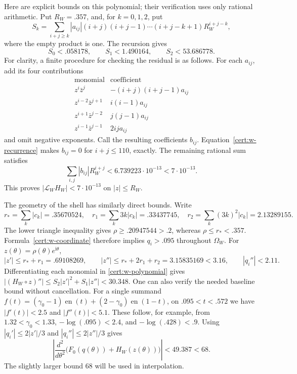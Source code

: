 \documentclass[11pt]{article}
\numberwithin{equation}{section}
\theoremstyle{definition}
\theoremstyle{remark}
\DeclareMathOperator{\en}{en}
\begin{document}
Here are explicit bounds on this polynomial; their verification uses
only rational arithmetic.  Put $R_W=.357$, and, for $k=0,1,2$, put
\[
 S_k=\sum_{i+j\ge k}|a_{ij}|(i+j)(i+j-1)\cdots(i+j-k+1)
                      R_W^{i+j-k},
\]
where the empty product is one.  The recursion gives
\begin{equation}
 S_0<.058178,
 \qquad S_1<1.490164,
 \qquad S_2<53.686778.
 \label{cert:w-norms}
\end{equation}
For clarity, a finite procedure for checking the residual is as follows.
For each $a_{ij}$, add its four contributions
\[
 \begin{array}{c|c}
 \text{monomial}&\text{coefficient}\\ \hline
 z^i\bar z^j&-(i+j)(i+j-1)a_{ij}\\
 z^{i-2}\bar z^{j+1}&i(i-1)a_{ij}\\
 z^{i+1}\bar z^{j-2}&j(j-1)a_{ij}\\
 z^{i-1}\bar z^{j-1}&2ij a_{ij}
 \end{array}
\]
and omit negative exponents.  Call the resulting coefficients $b_{ij}$.
Equation~\eqref{cert:w-recurrence} makes $b_{ij}=0$ for $i+j\le110$,
exactly.  The remaining rational sum satisfies
\begin{equation}
 \sum_{i,j}|b_{ij}|R_W^{i+j}<6.739223\cdot10^{-13}<7\cdot10^{-13}.
 \label{cert:w-residual}
\end{equation}
This proves $|\mathcal L_WH_W|<7\cdot10^{-13}$ on $|z|\le R_W$.

The geometry of the shell has similarly direct bounds.  Write
\[
 r_* =\sum_k|c_k|=.35670524,\quad
 r_1=\sum_k3k|c_k|=.33437745,\quad
 r_2=\sum_k(3k)^2|c_k|=2.13289155.
\]
The lower triangle inequality gives $\rho\ge.20947544>.2$, whereas
$\rho\le r_*<.357$.  Formula~\eqref{cert:w-coordinate} therefore implies
$q_i>.095$ throughout $\Omega_W$.  For $z(\theta)=\rho(\theta)e^{\mathrm i\theta}$,
\begin{equation}
 |z'|\le r_*+r_1=.69108269,
 \qquad |z''|\le r_*+2r_1+r_2=3.15835169<3.16,
 \qquad |q_i''|<2.11.
 \label{cert:w-curve-derivatives}
\end{equation}
Differentiating each monomial in \eqref{cert:w-polynomial} gives
$|(H_W\circ z)''|\le S_2|z'|^2+S_1|z''|<30.348$.
One can also verify the needed baseline bound without cancellation.
For a single summand
$f(t)=(\gamma _0-1)\en(t)+(2-\gamma _0)\en(1-t)$, on
$.095<t<.572$ we have $|f'(t)|<2.5$ and $|f''(t)|<5.1$.
These follow, for example, from $1.32<\gamma _0<1.33$,
$-\log(.095)<2.4$, and $-\log(.428)<.9$.
Using $|q_i'|\le2|z'|/3$ and $|q_i''|\le2|z''|/3$ gives
\begin{equation}
 \left|\frac{d^2}{d\theta^2}
       \bigl(F_0(q(\theta))+H_W(z(\theta))\bigr)\right|
 <49.387<68.
 \label{cert:w-curvature}
\end{equation}
The slightly larger bound 68 will be used in interpolation.
\end{document}
